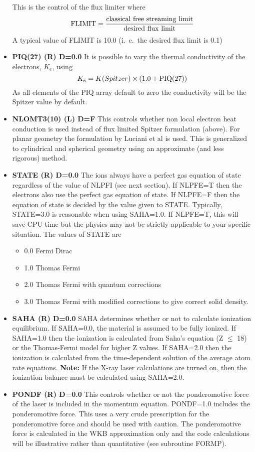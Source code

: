 \begin{itemize}
This is the control of the flux limiter where
$${\rm FLIMIT}= {{\rm classical\ free\ streaming\ limit}
\over {\rm desired\ flux\ limit}}$$
A typical value of FLIMIT is 10.0 (i.\ e.\ the desired flux limit is 0.1)
\item {\bf PIQ(27) (R) D=0.0}
It is possible to vary the thermal conductivity of the electrons, $K_e$,
using
$$K_e = K(Spitzer) \times (1.0 + {\rm PIQ(27)})$$
As all elements of the PIQ array default to zero the conductivity will
be the Spitzer value by default.
\item {\bf NLOMT3(10) (L) D=F}
This controls whether non local
electron heat conduction
is used instead of flux limited Spitzer formulation (above). For planar geometry
the formulation by Luciani et al\cite{Luciani} is used. This is generalized to cylindrical and spherical geometry
using an approximate (and less rigorous)  method.
\item {\bf STATE (R) D=0.0}
The ions always have a perfect gas equation of state
regardless of the value of NLPFI (see next section).
If NLPFE=T then the electrons also
use the perfect gas equation of state. If NLPFE=F then the equation
of state is decided by the value given to STATE. Typically, STATE=3.0
is reasonable when using SAHA=1.0. If NLPFE=T, this will save CPU time but the physics may
not be strictly applicable to your specific situation. The values of
STATE are
\begin{itemize}
\begin{itemize}
\item {0.0} Fermi Dirac
\item {1.0} Thomas Fermi
\item {2.0} Thomas Fermi with quantum corrections
\item {3.0} Thomas Fermi with modified corrections to
give correct solid density.
\end{itemize}
\end{itemize}
\item {\bf SAHA (R) D=0.0}
SAHA determines whether or not to calculate ionization equilibrium.
\newline
If SAHA=0.0, the material is assumed to be fully ionized.
\newline
If SAHA=1.0
then the ionization is calculated from Saha's equation (Z $\le$ 18) or
the Thomas-Fermi model for higher Z values.
\newline
If SAHA=2.0 then the ionization is calculated from the time-dependent
solution of the average atom rate equations.
\newline
{\bf Note:} If the X-ray laser
calculations are turned on, then the ionization balance must be calculated
using SAHA=2.0.
\item {\bf PONDF (R) D=0.0}
This controls whether or not the ponderomotive force of the laser
is included in the momentum equation. PONDF=1.0 includes the
ponderomotive force. This uses a very crude prescription for the ponderomotive force and should be
used with caution. The ponderomotive force is calculated in the WKB approximation only and the code
calculations will be illustrative rather than quantitative (see subroutine FORMP).
\end{itemize}
\vspace*{5mm}

